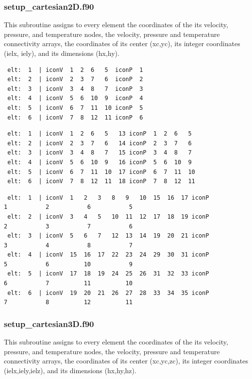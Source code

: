  \subsubsection{setup\_cartesian2D.f90}
 This subroutine assigns to every element the coordinates of the its velocity, pressure,
 and temperature nodes, the velocity, pressure and temperature connectivity arrays,
 the coordinates of its center (xc,yc), its integer coordinates (ielx, iely),
 and its dimensions (hx,hy).
 \begin{center}
 
 \end{center}
 \begin{verbatim}
 elt:  1  | iconV  1  2  6   5  iconP  1
 elt:  2  | iconV  2  3  7   6  iconP  2
 elt:  3  | iconV  3  4  8   7  iconP  3
 elt:  4  | iconV  5  6  10  9  iconP  4
 elt:  5  | iconV  6  7  11  10 iconP  5
 elt:  6  | iconV  7  8  12  11 iconP  6
 \end{verbatim}
 \begin{center}
 
 \end{center}
 \begin{verbatim}
 elt:  1  | iconV  1  2  6   5   13 iconP  1  2  6   5
 elt:  2  | iconV  2  3  7   6   14 iconP  2  3  7   6
 elt:  3  | iconV  3  4  8   7   15 iconP  3  4  8   7
 elt:  4  | iconV  5  6  10  9   16 iconP  5  6  10  9
 elt:  5  | iconV  6  7  11  10  17 iconP  6  7  11  10
 elt:  6  | iconV  7  8  12  11  18 iconP  7  8  12  11
 \end{verbatim}
 \begin{center}
 
 \end{center}
 \begin{verbatim}
 elt:  1  | iconV  1   2   3   8   9   10  15  16  17 iconP           1           2           6           5
 elt:  2  | iconV  3   4   5   10  11  12  17  18  19 iconP           2           3           7           6
 elt:  3  | iconV  5   6   7   12  13  14  19  20  21 iconP           3           4           8           7
 elt:  4  | iconV  15  16  17  22  23  24  29  30  31 iconP           5           6          10           9
 elt:  5  | iconV  17  18  19  24  25  26  31  32  33 iconP           6           7          11          10
 elt:  6  | iconV  19  20  21  26  27  28  33  34  35 iconP           7           8          12          11
 \end{verbatim}
 \subsubsection{setup\_cartesian3D.f90}
 This subroutine assigns to every element the coordinates of the its velocity, pressure,
 and temperature nodes, the velocity, pressure and temperature connectivity arrays,
 the coordinates of its center (xc,yc,zc), its integer coordinates (ielx,iely,ielz),
 and its dimensions (hx,hy,hz).
